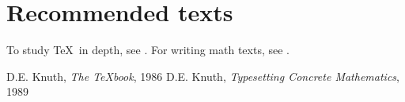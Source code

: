 \documentclass{article}
\begin{document}
\section*{Recommended texts}
To study \TeX\ in depth, see \cite{DK86}. For writing math texts, see \cite{DK89}.
\begin{thebibliography}{Knuth89}
 D.E. Knuth, \emph{The \TeX book}, 1986
 D.E. Knuth, \emph{Typesetting Concrete Mathematics}, 1989
\end{thebibliography}
\end{document}
